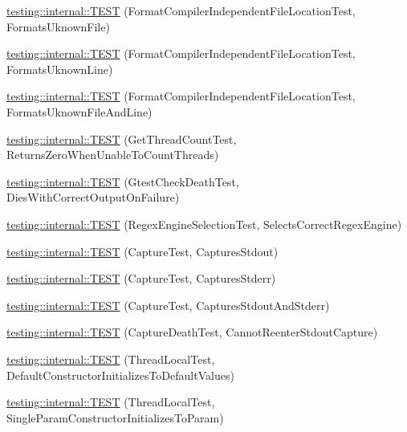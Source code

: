 \begin{DoxyCompactItemize}
\item 
\mbox{\hyperlink{namespacetesting_1_1internal_a65ad1cad17717c1b8ac4c2d4bef5e079}{testing\+::internal\+::\+T\+E\+ST}} (Format\+Compiler\+Independent\+File\+Location\+Test, Formats\+Uknown\+File)
\item 
\mbox{\hyperlink{namespacetesting_1_1internal_a0315a64a661f249628f2884080e0614f}{testing\+::internal\+::\+T\+E\+ST}} (Format\+Compiler\+Independent\+File\+Location\+Test, Formats\+Uknown\+Line)
\item 
\mbox{\hyperlink{namespacetesting_1_1internal_a8b9aee556f3dec6e67c35830ba55e0bd}{testing\+::internal\+::\+T\+E\+ST}} (Format\+Compiler\+Independent\+File\+Location\+Test, Formats\+Uknown\+File\+And\+Line)
\item 
\mbox{\hyperlink{namespacetesting_1_1internal_a5ad8299ae9325382f01b945f4f81711e}{testing\+::internal\+::\+T\+E\+ST}} (Get\+Thread\+Count\+Test, Returns\+Zero\+When\+Unable\+To\+Count\+Threads)
\item 
\mbox{\hyperlink{namespacetesting_1_1internal_afabff70df09a0e4fcda96dd36460c2b9}{testing\+::internal\+::\+T\+E\+ST}} (Gtest\+Check\+Death\+Test, Dies\+With\+Correct\+Output\+On\+Failure)
\item 
\mbox{\hyperlink{namespacetesting_1_1internal_a198f7132f76dd44d48dac54dc5d38fbb}{testing\+::internal\+::\+T\+E\+ST}} (Regex\+Engine\+Selection\+Test, Selects\+Correct\+Regex\+Engine)
\item 
\mbox{\hyperlink{namespacetesting_1_1internal_a0b658d88cea3a2fe6775b1b269c0204b}{testing\+::internal\+::\+T\+E\+ST}} (Capture\+Test, Captures\+Stdout)
\item 
\mbox{\hyperlink{namespacetesting_1_1internal_abbc9510a4f690912c32835213d95198f}{testing\+::internal\+::\+T\+E\+ST}} (Capture\+Test, Captures\+Stderr)
\item 
\mbox{\hyperlink{namespacetesting_1_1internal_a341ff65f3ca44b27fc51f03a9a05bee8}{testing\+::internal\+::\+T\+E\+ST}} (Capture\+Test, Captures\+Stdout\+And\+Stderr)
\item 
\mbox{\hyperlink{namespacetesting_1_1internal_a325a786fb22b87e5aa8d8f584b42ab09}{testing\+::internal\+::\+T\+E\+ST}} (Capture\+Death\+Test, Cannot\+Reenter\+Stdout\+Capture)
\item 
\mbox{\hyperlink{namespacetesting_1_1internal_af366e28e373f36480decc2ea586f48f0}{testing\+::internal\+::\+T\+E\+ST}} (Thread\+Local\+Test, Default\+Constructor\+Initializes\+To\+Default\+Values)
\item 
\mbox{\hyperlink{namespacetesting_1_1internal_a5a52dd578217050e621ebd2aace97a70}{testing\+::internal\+::\+T\+E\+ST}} (Thread\+Local\+Test, Single\+Param\+Constructor\+Initializes\+To\+Param)

\end{DoxyCompactItemize}
